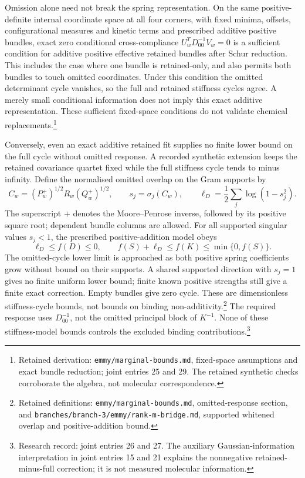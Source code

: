 \documentclass{article}
\begin{document}
Omission alone need not break the spring representation. On the same positive-definite internal coordinate space at all four corners, with fixed minima, offsets, configurational measures and kinetic terms and prescribed additive positive bundles, exact zero conditional cross-compliance \(U_w^TD_{00}^{-1}V_w=0\) is a sufficient condition for additive positive effective retained bundles after Schur reduction. This includes the case where one bundle is retained-only, and also permits both bundles to touch omitted coordinates. Under this condition the omitted determinant cycle vanishes, so the full and retained stiffness cycles agree. A merely small conditional information does not imply this exact additive representation. These sufficient fixed-space conditions do not validate chemical replacements.\footnote{Retained derivation: \texttt{emmy/marginal-bounds.md}, fixed-space assumptions and exact bundle reduction; joint entries 25 and 29. The retained synthetic checks corroborate the algebra, not molecular correspondence.}

Conversely, even an exact additive retained fit supplies no finite lower bound on the full cycle without omitted response. A recorded synthetic extension keeps the retained covariance quartet fixed while the full stiffness cycle tends to minus infinity. Define the normalised omitted overlap on the Gram supports by
\[
 C_w=(P_w^+)^{1/2}R_w(Q_w^+)^{1/2},\qquad s_j=\sigma_j(C_w),\qquad
 \ell_D=\frac12\sum_j\log(1-s_j^2).
\]
The superscript \(+\) denotes the Moore--Penrose inverse, followed by its positive square root; dependent bundle columns are allowed. For all supported singular values \(s_j<1\), the prescribed positive-addition model obeys
\[
 \ell_D\le f(D)\le0,\qquad f(S)+\ell_D\le f(K)\le\min\{0,f(S)\}.
\]
The omitted-cycle lower limit is approached as both positive spring coefficients grow without bound on their supports. A shared supported direction with \(s_j=1\) gives no finite uniform lower bound; finite known positive strengths still give a finite exact correction. Empty bundles give zero cycle. These are dimensionless stiffness-cycle bounds, not bounds on binding non-additivity.\footnote{Retained definitions: \texttt{emmy/marginal-bounds.md}, omitted-response section, and \texttt{branches/branch-3/emmy/rank-m-bridge.md}, supported whitened overlap and positive-addition bound.} The required response uses \(D_{00}^{-1}\), not the omitted principal block of \(K^{-1}\). None of these stiffness-model bounds controls the excluded binding contributions.\footnote{Research record: joint entries 26 and 27. The auxiliary Gaussian-information interpretation in joint entries 15 and 21 explains the nonnegative retained-minus-full correction; it is not measured molecular information.}
\end{document}
